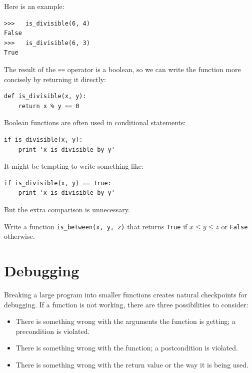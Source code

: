\documentclass[10pt]{book}
\begin{document}
Here is an example:

\beforeverb
\begin{verbatim}
>>>   is_divisible(6, 4)
False
>>>   is_divisible(6, 3)
True
\end{verbatim}
\afterverb
%
The result of the {\tt ==} operator is a boolean, so we can write the
function more concisely by returning it directly:

\beforeverb
\begin{verbatim}
def is_divisible(x, y):
    return x % y == 0
\end{verbatim}
\afterverb
%
Boolean functions are often used in conditional statements:


\beforeverb
\begin{verbatim}
if is_divisible(x, y):
    print 'x is divisible by y'
\end{verbatim}
\afterverb
%
It might be tempting to write something like:

\beforeverb
\begin{verbatim}
if is_divisible(x, y) == True:
    print 'x is divisible by y'
\end{verbatim}
\afterverb
%
But the extra comparison is unnecessary.

\begin{ex}
Write a function \verb"is_between(x, y, z)" that
returns {\tt True} if $x \le y \le z$ or {\tt False} otherwise.
\end{ex}


\section{Debugging}
\label{factdebug}


Breaking a large program into smaller functions creates natural
checkpoints for debugging.  If a function is not working, there are
three possibilities to consider:

\begin{itemize}

\item There is something wrong with the arguments the function
is getting; a precondition is violated.

\item There is something wrong with the function; a postcondition
is violated.

\item There is something wrong with the return value or the
way it is being used.

\end{itemize}
\end{document}
